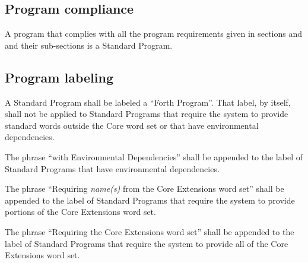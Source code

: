\subsection{Program compliance} %

A program that complies with all the program requirements given in
sections  and  and their sub-sections is
a Standard Program.

\subsection{Program labeling} %

A Standard Program shall be labeled a ``Forth Program''. That
label, by itself, shall not be applied to Standard Programs that
require the system to provide standard words outside the Core word
set or that have environmental dependencies.

The phrase ``with Environmental Dependencies'' shall be appended to
the label of Standard Programs that have environmental dependencies.

The phrase ``Requiring \emph{name(s)} from the Core Extensions word
set'' shall be appended to the label of Standard Programs that
require the system to provide portions of the Core Extensions word
set.

The phrase ``Requiring the Core Extensions word set'' shall be
appended to the label of Standard Programs that require the system
to provide all of the Core Extensions word set.
